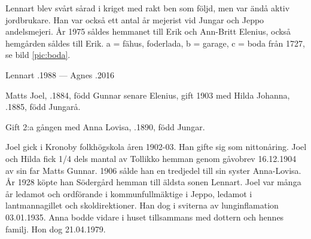 Lennart blev svårt sårad i kriget med rakt ben som följd, men var ändå aktiv jordbrukare. Han var också ett antal år mejerist vid Jungar och Jeppo andelsmejeri. År 1975 såldes hemmanet till Erik och Ann-Britt Elenius, också hemgården såldes till Erik. a = fähus, foderlada, b = garage, c = boda från 1727, se bild \ref{pic:boda}.

Lennart .1988 --- Agnes .2016\jhvspace{}


%
Matts Joel, .1884, född Gunnar senare Elenius, gift 1903 med Hilda Johanna, .1885, född Jungarå.
\begin{jhchildren}
  \item {}
  \item {}
  \item {}
  \item {}
  \item {}
\end{jhchildren}


Gift 2:a gången med Anna Lovisa, .1890, född Jungar.
\begin{jhchildren}
  \item {}
  \item {}
  \item {}
\end{jhchildren}
Joel gick i Kronoby folkhögskola åren 1902-03. Han gifte sig som nittonåring. Joel och Hilda fick 1/4 dels mantal av Tollikko hemman genom gåvobrev 16.12.1904 av sin far Matts Gunnar. 1906 sålde han en tredjedel till sin syster Anna-Lovisa. År 1928 köpte han Södergård hemman till äldsta sonen Lennart. Joel var många år ledamot och ordförande i kommunfullmäktige i Jeppo, ledamot i lantmannagillet och skoldirektioner. Han dog i sviterna av lunginflamation 03.01.1935. Anna bodde vidare i huset tillsammans med dottern och hennes familj. Hon dog 21.04.1979.


